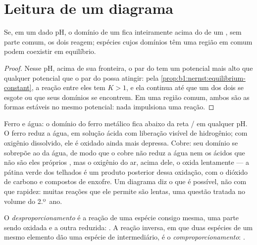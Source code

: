 \section{Leitura de um diagrama}\label{sec:b1:e-ph-diagrams:reading}

\begin{proposition}\label{prop:b1:e-ph-diagrams:disjoint-domains}
Se, em um dado pH, o domínio de um  fica inteiramente acima do
de um , sem parte comum, os dois reagem; espécies cujos domínios
têm uma região em comum podem coexistir em equilíbrio.
\end{proposition}

\begin{proof}
Nesse pH, acima de sua fronteira, o par do  tem um potencial
mais alto que qualquer potencial que o par do  possa atingir:
pela \cref{prop:b1:nernst:equilibrium-constant}, a reação entre eles tem
$K > 1$, e ela continua até que um dos dois se esgote ou que seus
domínios se encontrem. Em uma região comum, ambos são as formas estáveis
no mesmo potencial: nada impulsiona uma reação.
\end{proof}

Ferro e água: o domínio do ferro metálico fica abaixo da reta
/ em qualquer pH. O ferro reduz a água, em solução ácida
com liberação visível de hidrogênio; com oxigênio dissolvido, ele é
oxidado ainda mais depressa. Cobre: seu domínio se sobrepõe ao da água,
de modo que o cobre não reduz a água nem os ácidos que não são eles
próprios , mas o oxigênio do ar, acima dele, o oxida lentamente
--- a pátina verde dos telhados é um produto posterior dessa oxidação,
com o dióxido de carbono e compostos de enxofre. Um diagrama diz o que é
possível, não com que rapidez: muitas reações que ele permite são lentas,
uma questão tratada no volume do 2.º~ano.

\begin{definition}\label{def:b1:e-ph-diagrams:disproportionation}
O \emph{desproporcionamento} é a reação de uma
espécie consigo mesma, uma parte sendo oxidada e a outra reduzida:
. A reação inversa, em que duas espécies de um
mesmo elemento dão uma espécie de  intermediário, é o
\emph{comproporcionamento}:
.
\end{definition}

